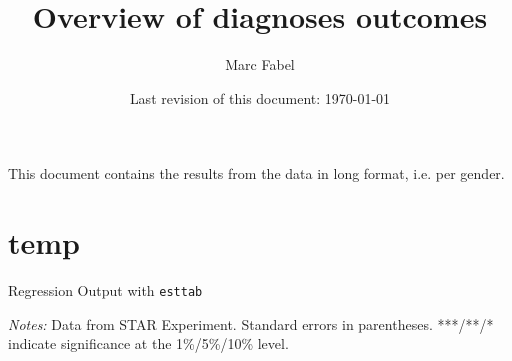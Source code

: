 \documentclass{scrartcl} %
\author{Marc Fabel}
\title{Overview of diagnoses outcomes}
\date{Last revision of this document: \today}
\begin{document}
\maketitle
This document contains the results from the data in long format, i.e. per gender.

\newpage


\section{temp}



%
%
%
%
\begin{table}[h] %
\begin{threeparttable}
\centering %
\caption{Regression Output with \texttt {esttab}} %
\label{table 1} %

\begin{tablenotes}
    \item \scriptsize 
\emph{Notes:} Data from STAR Experiment. Standard errors in parentheses. ***/**/* indicate significance at the 1\%/5\%/10\% level.
    \end{tablenotes}
  \end{threeparttable}
\end{table}
\end{document}
